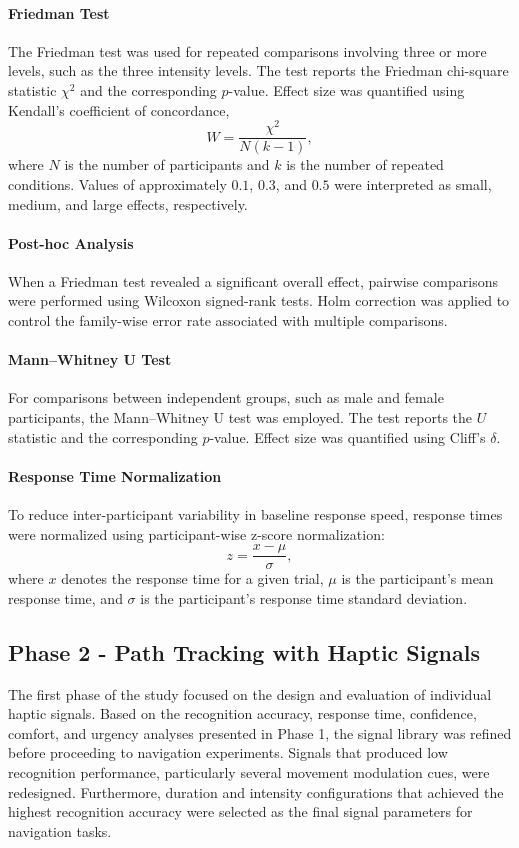 \documentclass[12pt]{report}
\begin{document}
\paragraph{Friedman Test}
The Friedman test was used for repeated comparisons involving three or more levels, such as the three intensity levels. The test reports the Friedman chi-square statistic $\chi^2$ and the corresponding $p$-value. Effect size was quantified using Kendall's coefficient of concordance,
\[
W = \frac{\chi^2}{N(k-1)},
\]
where $N$ is the number of participants and $k$ is the number of repeated conditions. Values of approximately $0.1$, $0.3$, and $0.5$ were interpreted as small, medium, and large effects, respectively.

\paragraph{Post-hoc Analysis}
When a Friedman test revealed a significant overall effect, pairwise comparisons were performed using Wilcoxon signed-rank tests. Holm correction was applied to control the family-wise error rate associated with multiple comparisons.

\paragraph{Mann--Whitney U Test}
For comparisons between independent groups, such as male and female participants, the Mann--Whitney U test was employed. The test reports the $U$ statistic and the corresponding $p$-value. Effect size was quantified using Cliff's $\delta$.

\paragraph{Response Time Normalization}
To reduce inter-participant variability in baseline response speed, response times were normalized using participant-wise z-score normalization:
\[
z = \frac{x-\mu}{\sigma},
\]
where $x$ denotes the response time for a given trial, $\mu$ is the participant's mean response time, and $\sigma$ is the participant's response time standard deviation.

\subsection{Phase 2 - Path Tracking with Haptic Signals}

The first phase of the study focused on the design and evaluation of individual haptic signals. Based on the recognition accuracy, response time, confidence, comfort, and urgency analyses presented in Phase 1, the signal library was refined before proceeding to navigation experiments. Signals that produced low recognition performance, particularly several movement modulation cues, were redesigned. Furthermore, duration and intensity configurations that achieved the highest recognition accuracy were selected as the final signal parameters for navigation tasks.
\end{document}
